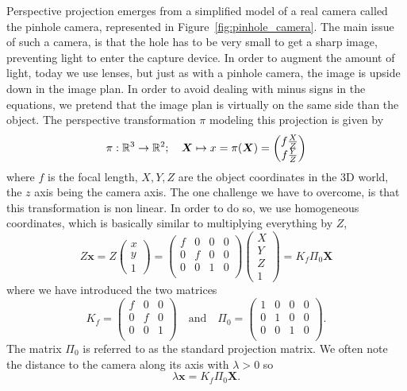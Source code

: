 Perspective projection emerges from a simplified model
of a real camera called the pinhole camera,
represented in Figure~\ref{fig:pinhole_camera}.
The main issue of such a camera,
is that the hole has to be very small to get a sharp image,
preventing light to enter the capture device.
In order to augment the amount of light, today we use lenses,
but just as with a pinhole camera, the image is upside down in the image plan.
In order to avoid dealing with minus signs in the equations,
we pretend that the image plan is virtually on the same side than the object.
The perspective transformation $\pi$ modeling this projection is given by
\[ \pi : \mathbb{R}^3 \rightarrow \mathbb{R}^2; \quad
	\bm{X} \mapsto x = \pi(\bm{X}) =
	\begin{pmatrix}
		f \frac{X}{Z} \\
		f \frac{Y}{Z} \\
	\end{pmatrix}
\]
where $f$ is the focal length, $X,Y,Z$ are the object coordinates
in the 3D world, the $z$ axis being the camera axis.
The one challenge we have to overcome, is that this transformation is non linear.
In order to do so, we use homogeneous coordinates,
which is basically similar to multiplying everything by $Z$,
\[ Z \bm{x} = Z \begin{pmatrix} x \\ y \\ 1 \end{pmatrix} =
	\begin{pmatrix}
		f & 0 & 0 & 0 \\
		0 & f & 0 & 0 \\
		0 & 0 & 1 & 0 \\
	\end{pmatrix}
	\begin{pmatrix}
		X \\ Y \\ Z \\ 1
	\end{pmatrix}
	= K_f \Pi_0 \bm{X}
\]
where we have introduced the two matrices
\[K_f =
	\begin{pmatrix}
		f & 0 & 0 \\
		0 & f & 0 \\
		0 & 0 & 1 \\
	\end{pmatrix}
	\quad \text{and} \quad
	\Pi_0 =
	\begin{pmatrix}
		1 & 0 & 0 & 0 \\
		0 & 1 & 0 & 0 \\
		0 & 0 & 1 & 0 \\
	\end{pmatrix}.
\]
The matrix $\Pi_0$ is referred to as the standard projection matrix.
We often note the distance to the camera along its axis with $\lambda > 0$ so
\[
	\lambda \bm{x} = K_f \Pi_0 \bm{X}.
\]


